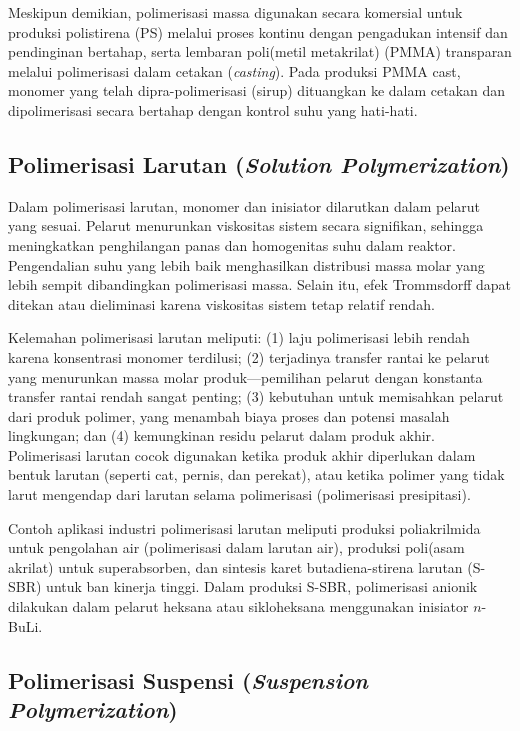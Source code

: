 \documentclass[12pt,a4paper,openany]{book}
\begin{document}
Meskipun demikian, polimerisasi massa digunakan secara komersial untuk produksi polistirena (PS) melalui proses kontinu dengan pengadukan intensif dan pendinginan bertahap, serta lembaran poli(metil metakrilat) (PMMA) transparan melalui polimerisasi dalam cetakan (\textit{casting}). Pada produksi PMMA cast, monomer yang telah dipra-polimerisasi (sirup) dituangkan ke dalam cetakan dan dipolimerisasi secara bertahap dengan kontrol suhu yang hati-hati.

\subsection{Polimerisasi Larutan (\textit{Solution Polymerization})}

Dalam polimerisasi larutan, monomer dan inisiator dilarutkan dalam pelarut yang sesuai. Pelarut menurunkan viskositas sistem secara signifikan, sehingga meningkatkan penghilangan panas dan homogenitas suhu dalam reaktor. Pengendalian suhu yang lebih baik menghasilkan distribusi massa molar yang lebih sempit dibandingkan polimerisasi massa. Selain itu, efek Trommsdorff dapat ditekan atau dieliminasi karena viskositas sistem tetap relatif rendah.

Kelemahan polimerisasi larutan meliputi: (1) laju polimerisasi lebih rendah karena konsentrasi monomer terdilusi; (2) terjadinya transfer rantai ke pelarut yang menurunkan massa molar produk---pemilihan pelarut dengan konstanta transfer rantai rendah sangat penting; (3) kebutuhan untuk memisahkan pelarut dari produk polimer, yang menambah biaya proses dan potensi masalah lingkungan; dan (4) kemungkinan residu pelarut dalam produk akhir. Polimerisasi larutan cocok digunakan ketika produk akhir diperlukan dalam bentuk larutan (seperti cat, pernis, dan perekat), atau ketika polimer yang tidak larut mengendap dari larutan selama polimerisasi (polimerisasi presipitasi).

Contoh aplikasi industri polimerisasi larutan meliputi produksi poliakrilmida untuk pengolahan air (polimerisasi dalam larutan air), produksi poli(asam akrilat) untuk superabsorben, dan sintesis karet butadiena-stirena larutan (S-SBR) untuk ban kinerja tinggi. Dalam produksi S-SBR, polimerisasi anionik dilakukan dalam pelarut heksana atau sikloheksana menggunakan inisiator $n$-BuLi.

\subsection{Polimerisasi Suspensi (\textit{Suspension Polymerization})}
\end{document}
